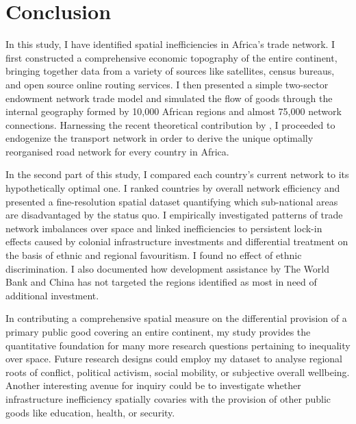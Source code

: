 \documentclass[11pt, oneside]{article}   	%
\begin{document}
\section{Conclusion}
\label{chap:conclusion}

In this study, I have identified spatial inefficiencies in Africa's trade network. I first constructed a comprehensive economic topography of the entire continent, bringing together data from a variety of sources like satellites, census bureaus, and open source online routing services. I then presented a simple two-sector endowment network trade model and simulated the flow of goods through the internal geography formed by 10,000 African regions and almost 75,000 network connections. Harnessing the recent theoretical contribution by \cite{fajgelbaum_optimal_2017}, I proceeded to endogenize the transport network in order to derive the unique optimally reorganised road network for every country in Africa.

In the second part of this study, I compared each country's current network to its hypothetically optimal one. I ranked countries by overall network efficiency and presented a fine-resolution spatial dataset quantifying which sub-national areas are disadvantaged by the status quo. I empirically investigated patterns of trade network imbalances over space and linked inefficiencies to persistent lock-in effects caused by colonial infrastructure investments and differential treatment on the basis of ethnic and regional favouritism. I found no effect of ethnic discrimination. I also documented how development assistance by The World Bank and China has not targeted the regions identified as most in need of additional investment.

In contributing a comprehensive spatial measure on the differential provision of a primary public good covering an entire continent, my study provides the quantitative foundation for many more research questions pertaining to inequality over space. Future research designs could employ my dataset to analyse regional roots of conflict, political activism, social mobility, or subjective overall wellbeing. Another interesting avenue for inquiry could be to investigate whether infrastructure inefficiency spatially covaries with the provision of other public goods like education, health, or security.
\end{document}
